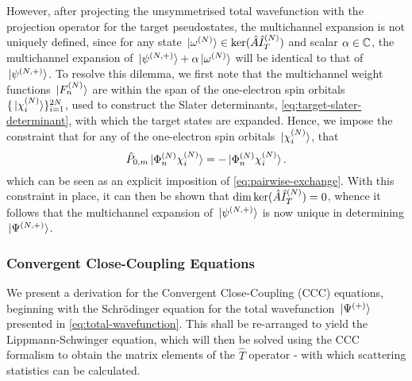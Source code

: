 \documentclass[]{article}
\begin{document}
However, after projecting the unsymmetrised total wavefunction with the
projection operator for the target pseudostates, the multichannel expansion is
not uniquely defined, since for any state
$\ket*{\omega^{(N)}} \in \ker(\hat{A}\hat{I}_{T}^{(N)})$ and scalar
$\alpha \in \mathbb{C}$, the multichannel
expansion of $\ket*{\psi^{(N, +)}} + \alpha \ket*{\omega^{(N)}}$ will be
identical to that of $\ket*{\psi^{(N, +)}}$.
To resolve this dilemma, we first note that the multichannel weight functions
$\ket*{F_{n}^{(N)}}$ are within the span of the one-electron spin orbitals
$\lbrace\ket*{\chi_{i}^{(N)}}\rbrace_{i = 1}^{2N}$, used to construct the Slater
determinants, \eqref{eq:target-slater-determinant}, with which the target
states are expanded.
Hence, we impose the constraint that for any of the one-electron spin orbitals
$\ket*{\chi_{i}^{(N)}}$, that
\begin{equation}
  \label{eq:multichannel-constraint}
  \hat{P}_{0, m}
  \ket*{\Phi_{n}^{(N)} \chi_{i}^{(N)}}
  =
  -
  \ket*{\Phi_{n}^{(N)} \chi_{i}^{(N)}}
  .
\end{equation}
which can be seen as an explicit imposition of \eqref{eq:pairwise-exchange}.
With this constraint in place, it can then be shown that
$\dim\ker(\hat{A}\hat{I}_{T}^{(N)}) = 0$, whence it follows that the
multichannel expansion of $\ket*{\psi^{(N, +)}}$ is now unique in determining
$\ket*{\Psi^{(N, +)}}$.

\subsubsection{Convergent Close-Coupling Equations}
\label{sec:th-ccc-eq}

We present a derivation for the Convergent Close-Coupling (CCC) equations,
beginning with the Schr\"odinger equation for the total wavefunction
$\ket*{\Psi^{(+)}}$ presented in \eqref{eq:total-wavefunction}.
This shall be re-arranged to yield the Lippmann-Schwinger equation, which will
then be solved using the CCC formalism to obtain the matrix elements of the
$\hat{T}$ operator - with which scattering statistics can be calculated.
\end{document}
